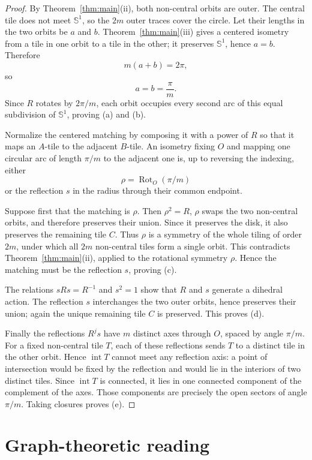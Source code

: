 \documentclass[10.5pt]{article}
\theoremstyle{remark}
\newcommand{\Sph}{\mathbb S}
\newcommand{\interior}{\operatorname{int}}
\begin{document}
\begin{proof}
By Theorem~\ref{thm:main}(ii), both non-central orbits are outer. The central tile does not meet $\Sph^1$, so the $2m$ outer traces cover the circle. Let their lengths in the two orbits be $a$ and $b$. Theorem~\ref{thm:main}(iii) gives a centered isometry from a tile in one orbit to a tile in the other; it preserves $\Sph^1$, hence $a=b$. Therefore
\[
 m(a+b)=2\pi,
\]
so
\[
 a=b=\frac{\pi}{m}.
\]
Since $R$ rotates by $2\pi/m$, each orbit occupies every second arc of this equal subdivision of $\Sph^1$, proving (a) and (b).

Normalize the centered matching by composing it with a power of $R$ so that it maps an $A$-tile to the adjacent $B$-tile. An isometry fixing $O$ and mapping one circular arc of length $\pi/m$ to the adjacent one is, up to reversing the indexing, either
\[
 \rho=\operatorname{Rot}_O(\pi/m)
\]
or the reflection $s$ in the radius through their common endpoint.

Suppose first that the matching is $\rho$. Then $\rho^2=R$, $\rho$ swaps the two non-central orbits, and therefore preserves their union. Since it preserves the disk, it also preserves the remaining tile $C$. Thus $\rho$ is a symmetry of the whole tiling of order $2m$, under which all $2m$ non-central tiles form a single orbit. This contradicts Theorem~\ref{thm:main}(ii), applied to the rotational symmetry $\rho$. Hence the matching must be the reflection $s$, proving (c).

The relations $sRs=R^{-1}$ and $s^2=1$ show that $R$ and $s$ generate a dihedral action. The reflection $s$ interchanges the two outer orbits, hence preserves their union; again the unique remaining tile $C$ is preserved. This proves (d).

Finally the reflections $R^js$ have $m$ distinct axes through $O$, spaced by angle $\pi/m$. For a fixed non-central tile $T$, each of these reflections sends $T$ to a distinct tile in the other orbit. Hence $\interior T$ cannot meet any reflection axis: a point of intersection would be fixed by the reflection and would lie in the interiors of two distinct tiles. Since $\interior T$ is connected, it lies in one connected component of the complement of the axes. Those components are precisely the open sectors of angle $\pi/m$. Taking closures proves (e).
\end{proof}

\section{Graph-theoretic reading}
\end{document}
